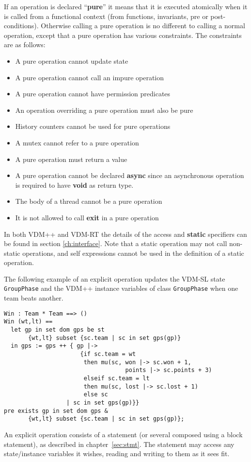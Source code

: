 \documentclass{overturerepchap}
\newcommand{\keyw}[1]{{\bf\ttfamily #1}}
\begin{document}
{\begin{description}
  If an operation is declared ``\keyw{pure}'' it means that it is
  executed atomically when it is called from a functional context
  (from functions, invariants, pre or post-conditions). Otherwise
  calling a pure operation is no different to calling a normal
  operation, except that a pure operation has various constraints. The
  constraints are as follows:

  \begin{itemize}
  \item A pure operation cannot update state
  \item A pure operation cannot call an impure operation
  \item A pure operation cannot have permission predicates
  \item An operation overriding a pure operation must also be pure
  \item History counters cannot be used for pure operations
  \item A mutex cannot refer to a pure operation
  \item A pure operation must return a value
  \item A pure operation cannot be declared \keyw{async} since an
    asynchronous operation is required to have \keyw{void} as return
    type.
  \item The body of a thread cannot be a pure operation
  \item It is not allowed to call \keyw{exit} in a pure operation
  \end{itemize}
  
  In both VDM++ and VDM-RT the details of the
  access and \keyw{static} specifiers can be found in section
  \ref{ch:interface}. Note that a static operation may not call
  non-static operations, and self expressions cannot be
  used in the definition of a static operation.

The following example of an explicit operation updates the VDM-SL
state \texttt{GroupPhase} and the VDM++ instance variables of class
\texttt{GroupPhase} when one team beats another.
\begin{lstlisting}
Win : Team * Team ==> ()
Win (wt,lt) ==
  let gp in set dom gps be st
       {wt,lt} subset {sc.team | sc in set gps(gp)}
  in gps := gps ++ { gp |->
                      {if sc.team = wt
                       then mu(sc, won |-> sc.won + 1,
                                   points |-> sc.points + 3)
                       elseif sc.team = lt
                       then mu(sc, lost |-> sc.lost + 1)
                       else sc
                  | sc in set gps(gp)}}
pre exists gp in set dom gps &
       {wt,lt} subset {sc.team | sc in set gps(gp)};
\end{lstlisting}
\label{winDef}
An explicit operation consists of a statement (or several composed
using a block statement), as described in chapter~\ref{sec:stmt}. The
statement may access any state/instance
variables it wishes, reading and writing to them as it sees fit.


\end{description}}
\end{document}
